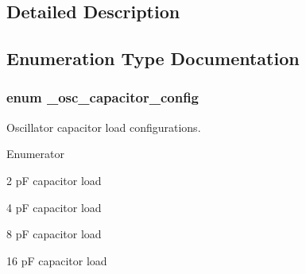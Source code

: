 \subsection{Detailed Description}


\subsection{Enumeration Type Documentation}
\subsubsection[{\texorpdfstring{\+\_\+osc\+\_\+capacitor\+\_\+config}{_osc_capacitor_config}}]{\setlength{\rightskip}{0pt plus 5cm}enum {\bf \+\_\+osc\+\_\+capacitor\+\_\+config}}\hypertarget{group__osc__hal_ga16ed70cebc49879af6f12be1a893595e}{}\label{group__osc__hal_ga16ed70cebc49879af6f12be1a893595e}


Oscillator capacitor load configurations. 

\begin{Desc}
\item[Enumerator]\par
\begin{description}
\item[{\em 
k\+Osc\+Capacitor2p\hypertarget{group__osc__hal_gga16ed70cebc49879af6f12be1a893595eaebd1254426bdca39d45962e6fa96aae8}{}\label{group__osc__hal_gga16ed70cebc49879af6f12be1a893595eaebd1254426bdca39d45962e6fa96aae8}
}]2 pF capacitor load \item[{\em 
k\+Osc\+Capacitor4p\hypertarget{group__osc__hal_gga16ed70cebc49879af6f12be1a893595ea88bf8bd84051bcaa9b3e92513c8fa188}{}\label{group__osc__hal_gga16ed70cebc49879af6f12be1a893595ea88bf8bd84051bcaa9b3e92513c8fa188}
}]4 pF capacitor load \item[{\em 
k\+Osc\+Capacitor8p\hypertarget{group__osc__hal_gga16ed70cebc49879af6f12be1a893595eab1776582cbc311ef8efceed62e30192a}{}\label{group__osc__hal_gga16ed70cebc49879af6f12be1a893595eab1776582cbc311ef8efceed62e30192a}
}]8 pF capacitor load \item[{\em 
k\+Osc\+Capacitor16p\hypertarget{group__osc__hal_gga16ed70cebc49879af6f12be1a893595ea479b914c5eb49cd49f2410c7d3e8c23b}{}\label{group__osc__hal_gga16ed70cebc49879af6f12be1a893595ea479b914c5eb49cd49f2410c7d3e8c23b}
}]16 pF capacitor load \end{description}
\end{Desc}


